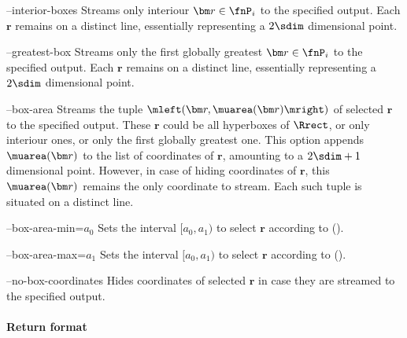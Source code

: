 \begin{procarg}{--interior-boxes}
  Streams only interiour $\bm r \in \fnP_i$ to the specified output. Each $\bm r$ remains on a distinct line, essentially representing a $2\sdim$ dimensional point.
\end{procarg}

\begin{procarg}{--greatest-box}
  Streams only the first globally greatest $\bm r \in \fnP_i$ to the specified output. Each $\bm r$ remains on a distinct line, essentially representing a $2\sdim$ dimensional point.
\end{procarg}

\begin{procarg}{--box-area}
  Streams the tuple $\mleft(\bm r, \muarea(\bm r)\mright)$ of selected $\bm r$ to the specified output. These $\bm r$ could be all hyperboxes of $\Rrect$, or only interiour ones, or only the first globally greatest one. This option appends $\muarea(\bm r)$ to the list of coordinates of $\bm r$, amounting to a $2\sdim+1$ dimensional point. However, in case of hiding coordinates of $\bm r$, this $\muarea(\bm r)$ remains the only coordinate to stream. Each such tuple is situated on a distinct line.
\end{procarg}

\begin{procarg}{--box-area-min=$a_0$}
  Sets the interval $[a_0, a_1)$ to select $\bm r$ according to ().
\end{procarg}

\begin{procarg}{--box-area-max=$a_1$}
  Sets the interval $[a_0, a_1)$ to select $\bm r$ according to ().
\end{procarg}

\begin{procarg}{--no-box-coordinates}
  Hides coordinates of selected $\bm r$ in case they are streamed to the specified output.
\end{procarg}

\procargsilent


\paragraph{Return format}

